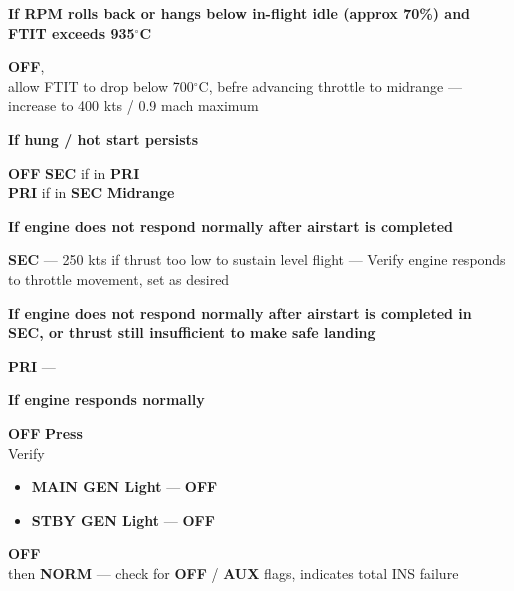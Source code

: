 \textbf{If RPM rolls back or hangs below in-flight idle (approx 70\%)
and FTIT exceeds 935$^\circ$C}

\begin{checklistenumerate}[resume]
    \blueitem[Throttle]\dotfill \textbf{OFF},\\
    allow FTIT to drop below 700$^\circ$C, 
    befre advancing throttle to midrange
    \blueitem[Airspeed] --- increase to 400 kts / 0.9 mach maximum
\end{checklistenumerate}

\textbf{If hung / hot start persists}

\begin{checklistenumerate}[resume]
    \blueitem[Throttle]\dotfill \textbf{OFF}
    \dotfill \textbf{SEC} if in \textbf{PRI}\\
    \hfill \textbf{PRI} if in \textbf{SEC}
    \blueitem[Throttle]\dotfill \textbf{Midrange}
\end{checklistenumerate}

\clearpage

\textbf{If engine does not respond normally after airstart is completed}

\begin{checklistenumerate}[resume]
    \dotfill \textbf{SEC}
    \blueitem[Airspeed] --- 250 kts if thrust too low to sustain level flight
    \blueitem[Throttle] --- Verify engine responds to throttle movement, set as desired
\end{checklistenumerate}

\textbf{%
    If engine does not respond normally after airstart is completed in SEC, 
    or thrust still insufficient to make safe landing
}

\begin{checklistenumerate}[resume]
    \dotfill \textbf{PRI}
     --- 
\end{checklistenumerate}

\textbf{If engine responds normally}

\begin{checklistenumerate}[resume]
    \dotfill \textbf{OFF}
    \dotfill \textbf{Press}\\
    Verify
    \begin{itemize}
        \item \textbf{MAIN GEN Light} --- \textbf{OFF}
        \item \textbf{STBY GEN Light} --- \textbf{OFF}
    \end{itemize}
    \dotfill \textbf{OFF}\\
    \hfill then \textbf{NORM}
    \blueitem[ADI] --- check for \textbf{OFF} / \textbf{AUX} flags,
    indicates total INS failure
\end{checklistenumerate}

